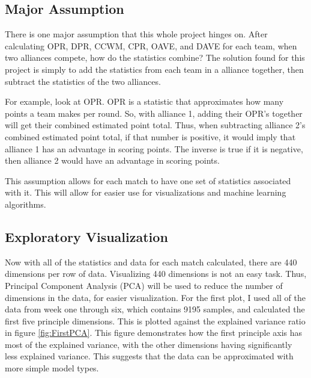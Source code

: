 \documentclass{article}
\begin{document}
\subsection{Major Assumption}
\par
There is one major assumption that this whole project hinges on. After calculating OPR, DPR, CCWM, CPR, OAVE, and DAVE for each team, when two alliances compete, how do the statistics combine? The solution found for this project is simply to add the statistics from each team in a alliance together, then subtract the statistics of the two alliances.
\par
For example, look at OPR. OPR is a statistic that approximates how many points a team makes per round. So, with alliance 1, adding their OPR's together will get their combined estimated point total. Thus, when subtracting alliance 2's combined estimated point total, if that number is positive, it would imply that alliance 1 has an advantage in scoring points. The inverse is true if it is negative, then alliance 2 would have an advantage in scoring points.
\par
This assumption allows for each match to have one set of statistics associated with it. This will allow for easier use for visualizations and machine learning algorithms.

\subsection{Exploratory Visualization} \label{PCA}
\par
Now with all of the statistics and data for each match calculated, there are 440 dimensions per row of data. Visualizing 440 dimensions is not an easy task. Thus, Principal Component Analysis (PCA) will be used to reduce the number of dimensions in the data, for easier visualization. For the first plot, I used all of the data from week one through six, which contains 9195 samples, and calculated the first five principle dimensions. This is plotted against the explained variance ratio in figure \ref{fig:FirstPCA}. This figure demonstrates how the first principle axis has most of the explained variance, with the other dimensions having significantly less explained variance. This suggests that the data can be approximated with more simple model types.
\end{document}
